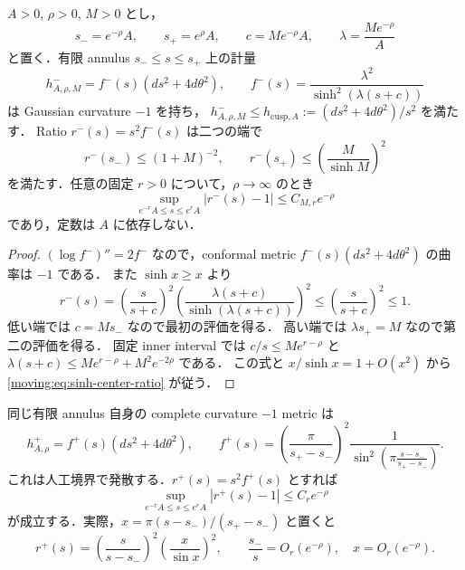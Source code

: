 \begin{lemma}
\label{moving:lem:sinh-barrier}
$A>0$, $\rho>0$, $M>0$ とし，
\[
 s_-=e^{-\rho}A,\qquad s_+=e^\rho A,
 \qquad c=M e^{-\rho}A,\qquad
 \lambda=\frac{M e^{-\rho}}{A}
\]
と置く．有限 annulus $s_-\le s\le s_+$ 上の計量
\begin{equation}\label{moving:eq:sinh-barrier}
 h^-_{A,\rho,M}
 = f^-(s)(ds^2+4d\theta^2),\qquad
 f^-(s)=\frac{\lambda^2}{\sinh^2(\lambda(s+c))}
\end{equation}
は Gaussian curvature $-1$ を持ち，
$h^-_{A,\rho,M}\le h_{\mathrm{cusp},A}:=(ds^2+4d\theta^2)/s^2$ を満たす．
Ratio $r^-(s)=s^2f^-(s)$ は二つの端で
\begin{equation}\label{moving:eq:sinh-face-ratios}
 r^-(s_-)\le(1+M)^{-2},\qquad
 r^-(s_+)\le\left(\frac{M}{\sinh M}\right)^2
\end{equation}
を満たす．任意の固定 $r>0$ について，$\rho\to\infty$ のとき
\begin{equation}\label{moving:eq:sinh-center-ratio}
 \sup_{e^{-r}A\le s\le e^r A}|r^-(s)-1|
 \le C_{M,r}e^{-\rho}
\end{equation}
であり，定数は $A$ に依存しない．
\end{lemma}

\begin{proof}
$(\log f^-)''=2f^-$ なので，conformal metric
$f^-(s)(ds^2+4d\theta^2)$ の曲率は $-1$ である．
また $\sinh x\ge x$ より
\[
 r^-(s)
 =\left(\frac{s}{s+c}\right)^2
   \left(\frac{\lambda(s+c)}{\sinh(\lambda(s+c))}\right)^2
 \le\left(\frac{s}{s+c}\right)^2\le1.
\]
低い端では $c=M s_-$ なので最初の評価を得る．
高い端では $\lambda s_+=M$ なので第二の評価を得る．
固定 inner interval では
$c/s\le M e^{r-\rho}$ と
$\lambda(s+c)\le M e^{r-\rho}+M^2e^{-2\rho}$ である．
この式と $x/\sinh x=1+O(x^2)$ から
\eqref{moving:eq:sinh-center-ratio} が従う．
\end{proof}

同じ有限 annulus 自身の complete curvature $-1$ metric は
\begin{equation}\label{moving:eq:complete-annulus-upper}
 h^+_{A,\rho}
 = f^+(s)(ds^2+4d\theta^2),\qquad
 f^+(s)=\left(\frac{\pi}{s_+-s_-}\right)^2
 \frac{1}{\sin^2\!\left(\pi\frac{s-s_-}{s_+-s_-}\right)}.
\end{equation}
これは人工境界で発散する．$r^+(s)=s^2f^+(s)$ とすれば
\begin{equation}\label{moving:eq:complete-center-ratio}
 \sup_{e^{-r}A\le s\le e^r A}|r^+(s)-1|
 \le C_r e^{-\rho}
\end{equation}
が成立する．実際，$x=\pi(s-s_-)/(s_+-s_-)$ と置くと
\[
 r^+(s)=\left(\frac{s}{s-s_-}\right)^2
        \left(\frac{x}{\sin x}\right)^2,
 \qquad \frac{s_-}{s}=O_r(e^{-\rho}),\quad x=O_r(e^{-\rho}).
\]

